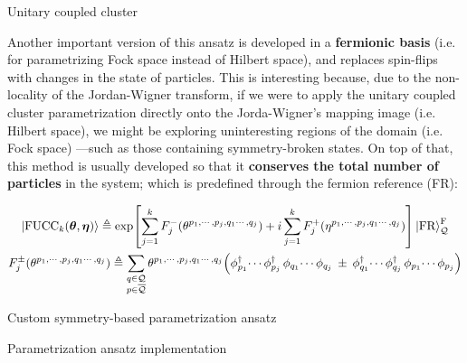 \documentclass[9pt, handout, aspectratio=169]{beamer}	%
\begin{document}
\begin{frame}[allowframebreaks]{Unitary coupled cluster}
\break

	Another important version of this ansatz is developed in a \textbf{fermionic basis} (i.e. for parametrizing Fock space instead of Hilbert space), and replaces spin-flips with changes in the state of particles. This is interesting because, due to the non-locality of the Jordan-Wigner transform, if we were to apply the unitary coupled cluster parametrization directly onto the Jorda-Wigner's mapping image (i.e. Hilbert space), we might be exploring uninteresting regions of the domain (i.e. Fock space) ---such as those containing symmetry-broken states. On top of that, this method is usually developed so that it \textbf{conserves the total number of particles} in the system; which is predefined through the fermion reference (FR):

	\begin{gather*}
	  \ket{\text{FUCC}_{k} \qty(\boldsymbol{\theta},\boldsymbol{\eta})} \triangleq
	    \exp[
	      \sum_{j=1}^{k} F_{j}^{-} \qty(\theta^{p_1,\cdots,p_j,q_1\cdots,q_j}) +i
	      \sum_{j=1}^{k} F_{j}^{+} \qty(\eta^{p_1,\cdots,p_j,q_1\cdots,q_j})
	    ]
	    \ket{\text{FR}}^{\text{F}}_{\mathcal{Q}} \\
	    F_{j}^{\pm} \qty(\theta^{p_1,\cdots,p_j,q_1\cdots,q_j}) \triangleq
	      \sum_{\substack{q \in \mathcal{Q} \\ p \in \overline{\mathcal{Q}}}}
	      \theta^{p_1,\cdots,p_j,q_1\cdots,q_j} \qty(
	        \phi^{\dagger}_{p_1} \! \cdots \phi^{\dagger}_{p_j} \,
	        \phi_{q_1} \! \cdots \phi_{q_j} \: \pm \:
	        \phi^{\dagger}_{q_1} \! \cdots \phi^{\dagger}_{q_j} \,
	        \phi_{p_1} \! \cdots \phi_{p_j}
	      )
	\end{gather*}

\end{frame}


\begin{frame}{Custom symmetry-based parametrization ansatz}

\end{frame}


\begin{frame}{Parametrization ansatz implementation}

\end{frame}

\end{document}
